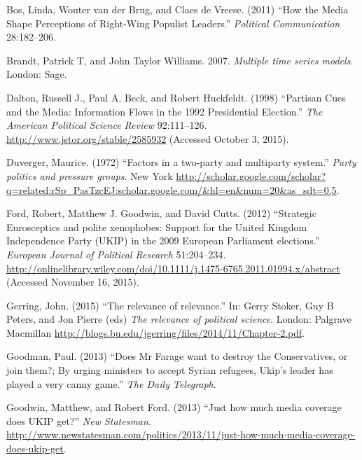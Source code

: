 \documentclass[12pt,article]{article}
\begin{document}
Bos, Linda, Wouter van der Brug, and Claes de Vreese. (2011) ``How the
Media Shape Perceptions of Right-Wing Populist Leaders.''
\emph{Political Communication} 28:182--206.

Brandt, Patrick T, and John Taylor Williams. 2007. \emph{Multiple time
series models}. London: Sage.

Dalton, Russell J., Paul A. Beck, and Robert Huckfeldt. (1998)
``Partisan Cues and the Media: Information Flows in the 1992
Presidential Election.'' \emph{The American Political Science Review}
92:111--126. \url{http://www.jstor.org/stable/2585932} (Accessed October
3, 2015).

Duverger, Maurice. (1972) ``Factors in a two-party and multiparty
system.'' \emph{Party politics and pressure groups}. New York
\url{http://scholar.google.com/scholar?q=related:rSp_PasTzcEJ:scholar.google.com/\&hl=en\&num=20\&as_sdt=0,5}.

Ford, Robert, Matthew J. Goodwin, and David Cutts. (2012) ``Strategic
Eurosceptics and polite xenophobes: Support for the United Kingdom
Independence Party (UKIP) in the 2009 European Parliament elections.''
\emph{European Journal of Political Research} 51:204--234.
\url{http://onlinelibrary.wiley.com/doi/10.1111/j.1475-6765.2011.01994.x/abstract}
(Accessed November 16, 2015).

Gerring, John. (2015) ``The relevance of relevance.'' In: Gerry Stoker,
Guy B Peters, and Jon Pierre (eds) \emph{The relevance of political
science}. London: Palgrave Macmillan
\url{http://blogs.bu.edu/jgerring/files/2014/11/Chapter-2.pdf}.

Goodman, Paul. (2013) ``Does Mr Farage want to destroy the
Conservatives, or join them?; By urging ministers to accept Syrian
refugees, Ukip's leader has played a very canny game.'' \emph{The Daily
Telegraph}.

Goodwin, Matthew, and Robert Ford. (2013) ``Just how much media coverage
does UKIP get?'' \emph{New Statesman}.
\url{http://www.newstatesman.com/politics/2013/11/just-how-much-media-coverage-does-ukip-get}.
\end{document}

